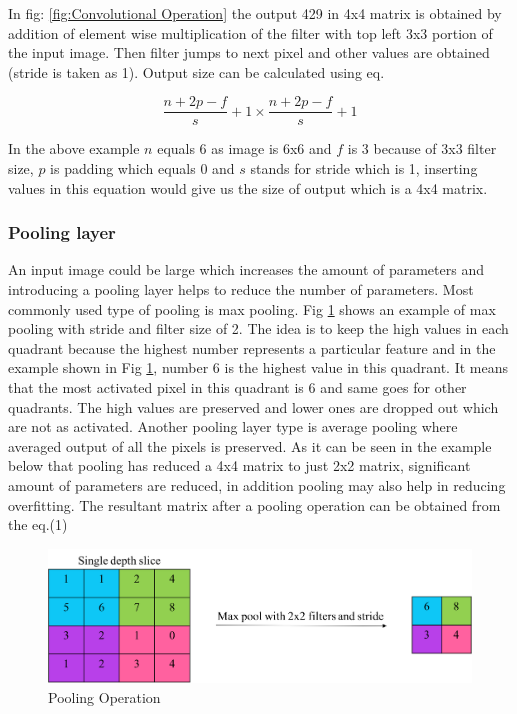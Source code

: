 \documentclass[11pt]{article}
\begin{document}
In fig: \ref{fig:Convolutional Operation} the output 429 in 4x4 matrix is obtained by addition of element wise multiplication of the filter with top left 3x3 portion of the input image. Then filter jumps to next pixel and other values are obtained (stride is taken as 1). Output size can be calculated using eq.

\begin{equation}
\frac{n+2p-f}{s}+1 \times \frac{n+2p-f}{s}+1
\end{equation}

In the above example $n$ equals 6 as image is 6x6 and $f$ is 3 because of 3x3 filter size, $p$ is padding which equals 0 and $s$ stands for stride which is 1, inserting values in this equation would give us the size of output which is a 4x4 matrix.

\subsubsection{Pooling layer}
An input image could be large which increases the amount of parameters and introducing a pooling layer helps to reduce the number of parameters. Most commonly used type of pooling is max pooling. Fig \ref{fig:Pooling Operation} shows an example of max pooling with stride and filter size of 2. The idea is to keep the high values in each quadrant because the highest number represents a particular feature and in the example shown in Fig \ref{fig:Pooling Operation}, number 6 is the highest value in this quadrant. It means that the most activated pixel in this quadrant is 6 and same goes for other quadrants. The high values are preserved and lower ones are dropped out which are not as activated. Another pooling layer type is average pooling where averaged output of all the pixels is preserved. As it can be seen in the example below that pooling has reduced a 4x4 matrix to just 2x2 matrix, significant amount of parameters are reduced, in addition pooling may also help in reducing overfitting. The resultant matrix after a pooling operation can be obtained from the eq.(1) 

\begin{figure}[H]
	\centering
	\includegraphics[width=.6\linewidth]{files/cnn_architecture/pooling.png}
	\caption{Pooling Operation}
	\label{fig:Pooling Operation}
\end{figure}
\end{document}
